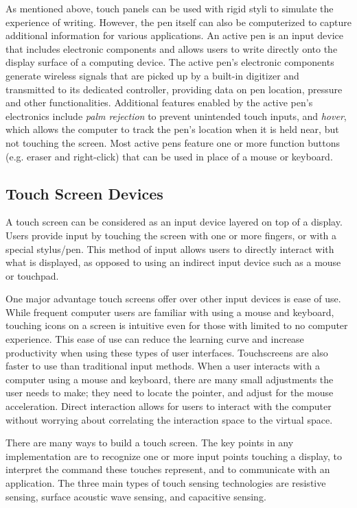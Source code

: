  As mentioned above, touch panels can be used with rigid styli to simulate the experience of writing. 
 However, the pen itself can also be computerized to capture additional information for various applications. 
 An active pen is an input device that includes electronic components and allows users to write directly onto the display surface of a computing device.
 The active pen's electronic components generate wireless signals that are picked up by a built-in digitizer and transmitted to its dedicated controller, providing data on pen location, pressure and other functionalities. 
 Additional features enabled by the active pen's electronics include \textit{palm rejection} to prevent unintended touch inputs, and \textit{hover}, which allows the computer to track the pen's location when it is held near, but not touching the screen. 
 Most active pens feature one or more function buttons (e.g. eraser and right-click) that can be used in place of a mouse or keyboard.

\subsection{Touch Screen Devices}

A touch screen can be considered as an input device layered on top of a display. 
Users provide input by touching the screen with one or more fingers, or with a special stylus/pen.
This method of input allows users to directly interact with what is displayed, as opposed to using an indirect input device such as a mouse or touchpad.

One major advantage touch screens offer over other input devices is ease of use.
While frequent computer users are familiar with using a mouse and keyboard, touching icons on a screen is intuitive even for those with limited to no computer experience.
This ease of use can reduce the learning curve and increase productivity when using these types of user interfaces.
Touchscreens are also faster to use than traditional input methods.
When a user interacts with a computer using a mouse and keyboard, there are many small adjustments the user needs to make; they need to locate the pointer, and adjust for the mouse acceleration.
Direct interaction allows for users to interact with the computer without worrying about correlating the interaction space to the virtual space. 

There are many ways to build a touch screen.
The key points in any implementation are to recognize one or more input points touching a display, to interpret the command these touches represent, and to communicate with an application.
The three main types of touch sensing technologies are resistive sensing, surface acoustic wave sensing, and capacitive sensing.

